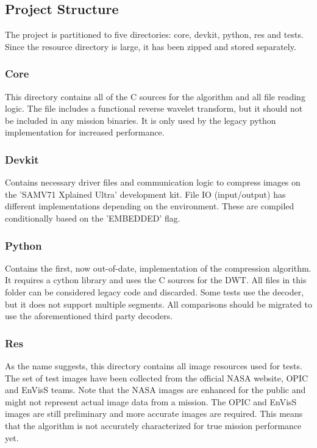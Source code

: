 \documentclass[12pt, a4paper]{article}
\begin{document}
\newpage
\subsection{Project Structure}
The project is partitioned to five directories: core, devkit, python, res and tests. 
Since the resource directory is large, it has been zipped and stored separately.

\noindent
\subsubsection{Core} 
This directory contains all of the C sources for the algorithm and all file reading logic. 
The  file includes a functional reverse wavelet transform, 
but it should not be included in any mission binaries. 
It is only used by the legacy python implementation for increased performance.

\noindent
\subsubsection{Devkit} 
Contains necessary driver files and communication logic to compress images on the 
'SAMV71 Xplained Ultra' development kit. 
File IO (input/output) has different implementations depending on the environment. 
These are compiled conditionally based on the 'EMBEDDED' flag. 

\noindent
\subsubsection{Python} 
Contains the first, now out-of-date, implementation of the compression algorithm. 
It requires a cython library and uses the C sources for the DWT. 
All files in this folder can be considered legacy code and discarded. 
Some tests use the  decoder, but it does not support multiple segments. 
All comparisons should be migrated to use the aforementioned third party decoders.

\noindent
\subsubsection{Res}
As the name suggests, this directory contains all image resources used for tests. 
The set of test images have been collected from the official NASA website, OPIC and EnVisS teams. 
Note that the NASA images are enhanced for the public and might not represent actual image data from a mission. 
The OPIC and EnVisS images are still preliminary and more accurate images are required. 
This means that the algorithm is not accurately characterized for true mission performance yet. 
\end{document}

